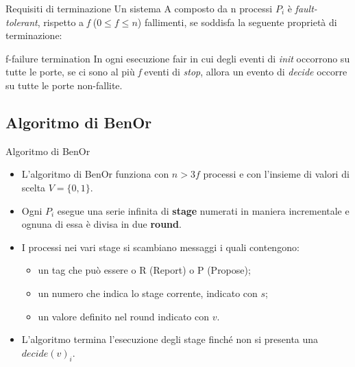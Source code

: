 \documentclass{beamer}
\begin{document}
    \begin{frame}{Requisiti di terminazione}
        Un sistema A composto da n processi $P_{i}$ è \textit{fault-tolerant}, rispetto a \textit{f} ($0 \leq f \leq n$) fallimenti, se soddisfa la seguente proprietà di terminazione:
        \begin{block}{f-failure termination}
            In ogni esecuzione fair in cui degli eventi di \textit{init} occorrono su tutte le porte, se ci sono al più \textit{f} eventi di \textit{stop}, allora un evento di \textit{decide} occorre su tutte le porte non-fallite.
        \end{block}
    \end{frame}

    \subsection{Algoritmo di BenOr}
    \begin{frame}{Algoritmo di BenOr}
        \begin{itemize}
            \item L'algoritmo di BenOr funziona con $n > 3f$ processi e con l'insieme di valori di scelta $V = \{0, 1\}$.

            \item Ogni $P_{i}$ esegue una serie infinita di \textbf{stage} numerati in maniera incrementale e ognuna di essa è divisa in due \textbf{round}.

            \item I processi nei vari stage si scambiano messaggi i quali contengono:
            \begin{itemize}
                \item un tag che può essere o R (Report) o P (Propose);
                \item un numero che indica lo stage corrente, indicato con $s$;
                \item un valore definito nel round indicato con $v$.
            \end{itemize}

            \item L'algoritmo termina l'esecuzione degli stage finché non si presenta una $decide(v)_{i}$.
        \end{itemize}
    \end{frame}
\end{document}
